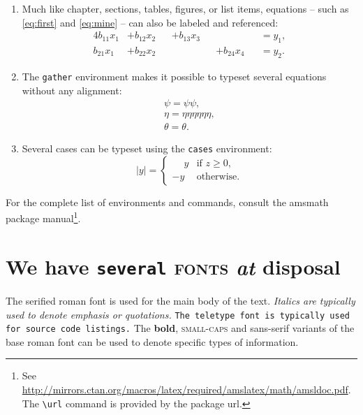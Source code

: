 \documentclass[
  digital, %
  table,   %
%
  lof,     %
  lot,     %
]{fithesis3}
\begin{document}
{\begin{enumerate}
  \item Much like chapter, sections, tables, figures, or list
    items, equations -- such as \eqref{eq:first} and
    \eqref{eq:mine} -- can also be labeled and referenced:
    \begin{alignat}{4}
      b_{11}x_1 &+ b_{12}x_2  &  &+ b_{13}x_3  &  &             &
        &= y_1,                   \label{eq:first} \\
      b_{21}x_1 &+ b_{22}x_2  &  &             &  &+ b_{24}x_4  &
        &= y_2. \tag{My equation} \label{eq:mine}
    \end{alignat}

  \item The \texttt{gather} environment makes it possible to
    typeset several equations without any alignment:
    \begin{gather}
      \psi = \psi\psi, \\
      \eta = \eta\eta\eta\eta\eta\eta, \\
      \theta = \theta.
    \end{gather}

  \item Several cases can be typeset using the \texttt{cases}
    environment:
    \begin{equation}
      |y| = \begin{cases}
        \phantom-y & \text{if }z\geq0, \\
                -y & \text{otherwise}.
      \end{cases}
    \end{equation}
\end{enumerate}
For the complete list of environments and commands, consult the
\textsf{amsmath} package manual\footnote{
  See \url{http://mirrors.ctan.org/macros/latex/required/amslatex/math/amsldoc.pdf}.
  The \texttt{\textbackslash url} command is provided by the
  package \textsf{url}.
}.

\chapter{\textnormal{We \textsf{have} \texttt{several} \textsc{fonts}
  \textit{at} \textbf{disposal}}}
The serified roman font is used for the main body of the text.
\textit{Italics are typically used to denote emphasis or
quotations.} \texttt{The teletype font is typically used for source
code listings.} The \textbf{bold}, \textsc{small-caps} and
\textsf{sans-serif} variants of the base roman font can be used to
denote specific types of information.

}
\end{document}
